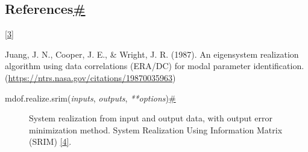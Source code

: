\begin{description}
\hypertarget{id6}{}
\hypertarget{references-1}{%
\subsection{\texorpdfstring{References\protect\hyperlink{id6}{\#}}{References\#}}\label{references-1}}

{{{[}}\protect\hyperlink{id5}{3}{{]}}}

Juang, J. N., Cooper, J. E., \& Wright, J. R. (1987). An eigensystem
realization algorithm using data correlations (ERA/DC) for modal
parameter identification.
(\url{https://ntrs.nasa.gov/citations/19870035963})
\end{description}

\begin{description}
\item[{ {{mdof.realize.}}{{srim}}{(}\emph{{{inputs}}},
\emph{{{outputs}}},
\emph{{{**}}{{options}}}{)}\protect\hyperlink{mdof.realize.srim}{\#}}]
System realization from input and output data, with output error
minimization method. System Realization Using Information Matrix (SRIM)
\protect\hyperlink{id10}{{{[}}4{{]}}}.


\end{description}
